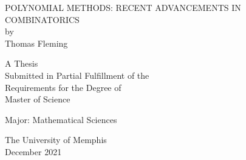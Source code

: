 \begin{titlepage}

\vspace*{.66in}
\begin{center}\uppercase{
		POLYNOMIAL METHODS: RECENT ADVANCEMENTS IN COMBINATORICS
}\vspace{.34in}\\
by\\
\vspace{.34in}
Thomas Fleming

\vspace{1.5in}
A Thesis \\
\vspace{14pt}
Submitted in Partial Fulfillment of the\\ \vspace{14pt}
Requirements for the Degree of\\ \vspace{14pt}
Master of Science
 \vspace{0.5in}

Major: Mathematical Sciences

\vspace{1.66in}
The University of Memphis \\
\vspace{14pt}
December 2021
\end{center}

\end{titlepage}
